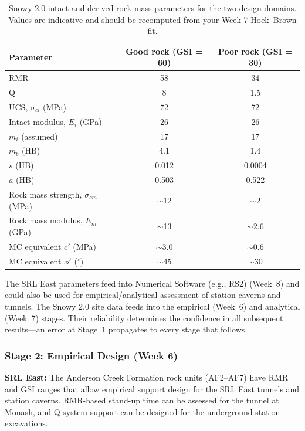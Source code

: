 \documentclass[a4paper,12pt]{article}
\begin{document}
\begin{table}[h!]
\centering
\small
\begin{tabular}{l c c}
\toprule
\textbf{Parameter} & \textbf{Good rock (GSI = 60)} & \textbf{Poor rock (GSI = 30)} \\
\midrule
RMR & 58 & 34 \\
Q & 8 & 1.5 \\
UCS, $\sigma_{ci}$ (MPa) & 72 & 72 \\
Intact modulus, $E_i$ (GPa) & 26 & 26 \\
$m_i$ (assumed) & 17 & 17 \\
$m_b$ (HB) & 4.1 & 1.4 \\
$s$ (HB) & 0.012 & 0.0004 \\
$a$ (HB) & 0.503 & 0.522 \\
Rock mass strength, $\sigma_{cm}$ (MPa) & $\sim$12 & $\sim$2 \\
Rock mass modulus, $E_m$ (GPa) & $\sim$13 & $\sim$2.6 \\
MC equivalent $c'$ (MPa) & $\sim$3.0 & $\sim$0.6 \\
MC equivalent $\phi'$ ($^\circ$) & $\sim$45 & $\sim$30 \\
\bottomrule
\end{tabular}
\caption{Snowy 2.0 intact and derived rock mass parameters for the two design domains. Values are indicative and should be recomputed from your Week 7 Hoek--Brown fit.}
\label{tab:snowy_params}
\end{table}

\begin{notebox}
The SRL East parameters feed into Numerical Software (e.g., RS2) (Week~8) and could also be used for empirical/analytical assessment of station caverns and tunnels. The Snowy 2.0 site data feeds into the empirical (Week~6) and analytical (Week~7) stages. Their reliability determines the confidence in all subsequent results---an error at Stage~1 propagates to every stage that follows.
\end{notebox}

\subsubsection{Stage 2: Empirical Design (Week 6)}

\textbf{SRL East:} The Anderson Creek Formation rock units (AF2--AF7) have RMR and GSI ranges that allow empirical support design for the SRL East tunnels and station caverns. RMR-based stand-up time can be assessed for the tunnel at Monash, and Q-system support can be designed for the underground station excavations.
\end{document}
